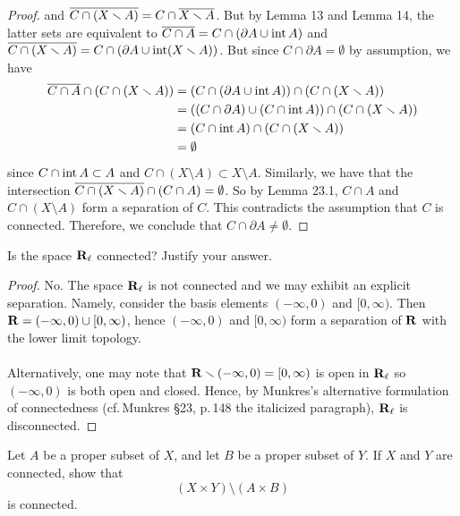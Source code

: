\begin{proof}
and $\overline{C\cap(X\smallsetminus A)}=C\cap\overline{X\smallsetminus
  A}$. But by Lemma 13 and Lemma 14, the latter sets are
equivalent to $\overline{C\cap A}=C\cap(\partial A\cup\operatorname{int}
  A)$ and $\overline{C\cap(X\smallsetminus
    A)}=C\cap(\partial A\cup\operatorname{int}(X\smallsetminus
    A))$. But since $C\cap\partial A=\emptyset$ by
assumption, we have
\begin{align*}
\overline{C\cap A}\cap(C\cap(X\smallsetminus A))
&=(C\cap(\partial A\cup\operatorname{int} A))
\cap(C\cap(X\smallsetminus A))\\
&=((C\cap\partial A)
\cup
(C\cap\operatorname{int} A))
\cap
(C\cap(X\smallsetminus A))\\
&=(C\cap\operatorname{int} A)\cap(C\cap(X\smallsetminus A))\\
&=\emptyset
\end{align*}
since $C\cap\operatorname{int} A\subset A$ and $C\cap(X\setminus
  A)\subset X\setminus A$. Similarly, we have that the intersection
$\overline{C\cap(X\smallsetminus A)}\cap(C\cap
  A)=\emptyset$. So by Lemma 23.1, $C\cap A$ and
$C\cap(X\setminus A)$ form a separation of $C$. This
contradicts the assumption that $C$ is connected. Therefore, we
conclude that $C\cap\partial A\neq\emptyset$.
\end{proof}
\newpage
\begin{problem}[Munkres \S23, Ex.\,7]
Is the space $\mathbf{R}_\ell$ connected? Justify your answer.
\end{problem}
\begin{proof}
No. The space $\mathbf{R}_\ell$ is not connected and we may exhibit an
explicit separation. Namely, consider the basis elements
$(-\infty,0)$ and $[0,\infty)$. Then
$\mathbf{R}=(-\infty,0)\cup[0,\infty)$, hence $(-\infty,0)$ and
$[0,\infty)$ form a separation of $\mathbf{R}$ with the lower limit
topology.
\\\\
Alternatively, one may note that
$\mathbf{R}\smallsetminus(-\infty,0)=[0,\infty)$ is open in $\mathbf{R}_\ell$ so
$(-\infty,0)$ is both open and closed. Hence, by Munkres's
alternative formulation of connectedness (cf.\,Munkres \S23,
p.\,148 the italicized paragraph), $\mathbf{R}_\ell$ is disconnected.
\end{proof}
\newpage
\begin{problem}[Munkres \S23, Ex.\,9]
Let $A$ be a proper subset of $X$, and let $B$ be a proper subset
of $Y$. If $X$ and $Y$ are connected, show that
\[
(X\times Y)\setminus(A\times B)
\]
is connected.
\end{problem}

